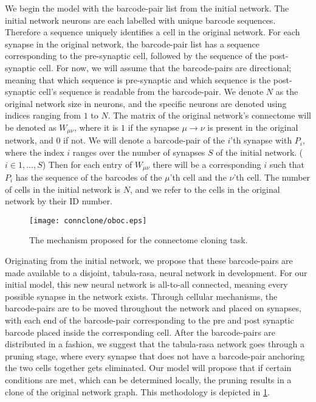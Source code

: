 \documentclass[../dissertation.tex]{subfiles}
\begin{document}
We begin the model with the barcode-pair list from the initial network.
The initial network neurons are each labelled with unique barcode sequences.
Therefore a sequence uniquely identifies a cell in the original network.
For each synapse in the original network, the barcode-pair list has a sequence corresponding to the pre-synaptic cell, followed by the sequence of the post-synaptic cell.
For now, we will assume that the barcode-pairs are directional; meaning that which sequence is pre-synaptic and which sequence is the post-synaptic cell's sequence is readable from the barcode-pair.
We denote $N$ as the original network size in neurons, and the specific neurons are denoted using indices ranging from $1$ to $N$.
The matrix of the original network's connectome will be denoted as $W_{\mu\nu}$, where it is $1$ if the synapse $\mu\rightarrow\nu$ is present in the original network, and $0$ if not.
We will denote a barcode-pair of the $i$'th synapse with $P_i$, where the index $i$ ranges over the number of synapses $S$ of the initial network.
($i \in {1, ... , S}$)
Then for each entry of $W_{\mu\nu}$ there will be a corresponding $i$ such that $P_i$ has the sequence of the barcodes of the $\mu$'th cell and the $\nu$'th cell.
The number of cells in the initial network is $N$, and we refer to the cells in the original network by their ID number.

\begin{figure}[ht]
    \centering
    \texttt{[image: connclone/oboc.eps]}
    \caption{The mechanism proposed for the connectome cloning task.}
    \label{fig:cc-oboc}
\end{figure}

Originating from the initial network, we propose that these barcode-pairs are made available to a disjoint, tabula-rasa, neural network in development.
For our initial model, this new neural network is all-to-all connected, meaning every possible synapse in the network exists.
Through cellular mechanisms, the barcode-pairs are to be moved throughout the network and placed on synapses, with each end of the barcode-pair corresponding to the pre and post synaptic barcode placed inside the corresponding cell.
After the barcode-pairs are distributed in a fashion, we suggest that the tabula-rasa network goes through a pruning stage, where every synapse that does not have a barcode-pair anchoring the two cells together gets eliminated.
Our model will propose that if certain conditions are met, which can be determined locally, the pruning results in a clone of the original network graph.
This methodology is depicted in \cref{fig:cc-oboc}.
\end{document}
